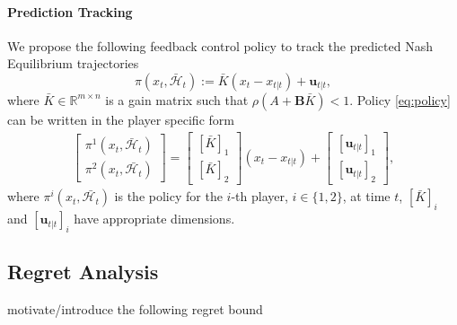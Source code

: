 \documentclass[letterpaper, 10 pt, conference]{ieeeconf}  %
\begin{document}
\paragraph{Prediction Tracking} We propose the following feedback control policy to track the predicted Nash Equilibrium trajectories
\begin{equation}\label{eq:policy}
    \pi(x_{t}, \bar{\mathcal{H}}_{t}) := \bar{K}(x_{t}-x_{t|t}) + \mathbf{u}_{t|t},
\end{equation}
where $\bar{K}\in \mathbb{R}^{m\times n}$ is a gain matrix such that $\rho(A+\mathbf{B}\bar{K}) < 1$. Policy \eqref{eq:policy} can be written in the player specific form
\begin{align*}
\begin{bmatrix}
    \pi^{1}(x_{t}, \bar{\mathcal{H}}_{t})\\
    \pi^{2}(x_{t}, \bar{\mathcal{H}_{t}})
\end{bmatrix}=
    \begin{bmatrix}
        [\bar{K}]_{1}\\
        [\bar{K}]_{2}
    \end{bmatrix}(x_{t}-x_{t|t}) + 
    \begin{bmatrix}
        [\mathbf{u}_{t|t}]_{1}\\
        [\mathbf{u}_{t|t}]_{2}
    \end{bmatrix},
\end{align*}
where $\pi^{i}(x_{t}, \bar{\mathcal{H}_{t}})$ is the policy for the $i$-th player, $i \in \{1,2\}$, at time $t$, $[\bar{K}]_{i}$ and $[\mathbf{u}_{t|t}]_{i}$ have appropriate dimensions.



\subsection{Regret Analysis}

{\color{red} motivate/introduce the following regret bound}
\end{document}
